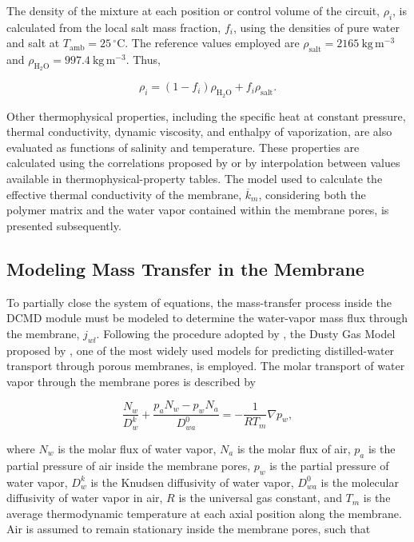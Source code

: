 \documentclass[14pt,letterpaper,fleqn]{extarticle}
\begin{document}
The density of the mixture at each position or control volume of the circuit,
$\rho_i$, is calculated from the local salt mass fraction, $f_i$, using the
densities of pure water and salt at
$T_{\mathrm{amb}}=25\,^{\circ}\mathrm{C}$. The reference values employed are
$\rho_{\mathrm{salt}}=2165~\mathrm{kg\,m^{-3}}$ and
$\rho_{\mathrm{H_2O}}=997.4~\mathrm{kg\,m^{-3}}$. Thus,

\begin{equation}
\rho_i
=
\left(
1-f_i
\right)
\rho_{\mathrm{H_2O}}
+
f_i\rho_{\mathrm{salt}}.
\label{eq:density-mixture}
\end{equation}

Other thermophysical properties, including the specific heat at constant
pressure, thermal conductivity, dynamic viscosity, and enthalpy of
vaporization, are also evaluated as functions of salinity and temperature.
These properties are calculated using the correlations proposed by
\citet{Sparrow2003} or by interpolation between values available in
thermophysical-property tables. The model used to calculate the effective
thermal conductivity of the membrane, $\overline{k}_m$, considering both the
polymer matrix and the water vapor contained within the membrane pores, is
presented subsequently.


\subsection{Modeling Mass Transfer in the Membrane}
\label{subsec:membrane-mass-transfer}

To partially close the system of equations, the mass-transfer process inside
the DCMD module must be modeled to determine the water-vapor mass flux through
the membrane, $j_{wl}$. Following the procedure adopted by
\citet{Lisboa2021}, the Dusty Gas Model proposed by
\citet{LawsonLloyd1997}, one of the most widely used models for predicting
distilled-water transport through porous membranes, is employed. The molar transport of water 
vapor through the membrane pores is described by

\begin{equation}
\frac{N_w}{D_w^k}
+
\frac{
p_aN_w-p_wN_a
}{
D_{wa}^{0}
}
=
-\frac{1}{RT_m}
\nabla p_w,
\label{eq:dusty-gas-model}
\end{equation}

where $N_w$ is the molar flux of water vapor, $N_a$ is the molar flux of air,
$p_a$ is the partial pressure of air inside the membrane pores, $p_w$ is the
partial pressure of water vapor, $D_w^k$ is the Knudsen diffusivity of water
vapor, $D_{wa}^{0}$ is the molecular diffusivity of water vapor in air, $R$ is
the universal gas constant, and $T_m$ is the average thermodynamic temperature
at each axial position along the membrane. Air is assumed to remain stationary 
inside the membrane pores, such that
\end{document}
